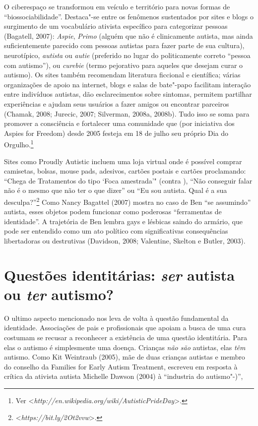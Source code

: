 O ciberespaço se transformou em veículo e território para novas formas
de ``biossociabilidade''. Destaca"-se entre os fenômenos sustentados por
sites e blogs o surgimento de um vocabulário ativista específico para
categorizar pessoas (Bagatell, 2007): \emph{Aspie}, \emph{Primo} (alguém
que não é clinicamente autista, mas ainda suficientemente parecido com
pessoas autistas para fazer parte de sua cultura), neurotípico,
\emph{autista} ou \emph{autie} (preferido no lugar do politicamente
correto ``pessoa com autismo''), ou \emph{curebie} (termo pejorativo
para aqueles que desejam curar o autismo). Os sites também recomendam
literatura ficcional e científica; várias organizações de apoio na
internet, blogs e salas de bate"-papo facilitam interação entre
indivíduos autistas, dão esclarecimentos sobre sintomas, permitem
partilhar experiências e ajudam seus usuários a fazer amigos ou
encontrar parceiros (Chamak, 2008; Jurecic, 2007; Silverman, 2008a,
2008b). Tudo isso se soma para promover a consciência e fortalecer uma
comunidade que (por iniciativa dos Aspies for Freedom) desde 2005
festeja em 18 de julho seu próprio Dia do Orgulho.\footnote[18]{Ver \textless{}\emph{http://en.wikipedia.org/wiki/AutisticPrideDay}\textgreater{}.}

Sites como Proudly Autistic incluem uma loja virtual onde é possível
comprar camisetas, bolsas, mouse pads, adesivos, cartões postais e
cartões proclamando: ``Chega de Tratamentos do tipo `Foca amestrada'"
(contra ), ``Não conseguir falar não é o mesmo que não ter o que
dizer'' ou ``Eu sou autista. Qual é a sua
desculpa?''\footnote[19]{\textless{}\emph{https://bit.ly/2Ot2vvw}\textgreater{}.} Como Nancy Bagattel (2007) mostra no
caso de Ben ``se assumindo'' autista, esses objetos podem funcionar como
poderosas ``ferramentas de identidade''. A trajetória de Ben lembra gays
e lésbicas saindo do armário, que pode ser entendido como um ato
político com significativas consequências libertadoras ou destrutivas
(Davidson, 2008; Valentine, Skelton e Butler, 2003).

\section{Questões identitárias: \emph{ser} autista ou \emph{ter} autismo?}

O ultimo aspecto mencionado nos leva de volta à questão fundamental da
identidade. Associações de pais e profissionais que apoiam a busca de
uma cura costumam se recusar a reconhecer a existência de uma questão
identitária. Para elas o autismo é simplesmente uma doença. Crianças
\emph{não são} autistas, elas \emph{têm} autismo. Como Kit Weintraub
(2005), mãe de duas crianças autistas e membro do conselho da Families
for Early Autism Treatment, escreveu em resposta à crítica da ativista
autista Michelle Dawson (2004) à ``industria do autismo"-)'',

